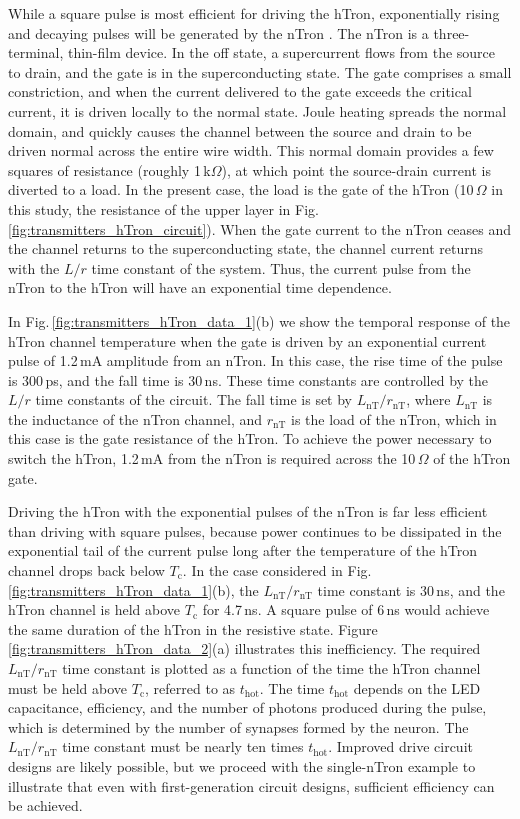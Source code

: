 \documentclass[aip,amsmath,amssymb,reprint,nofootinbib]{revtex4-1}
\begin{document}
While a square pulse is most efficient for driving the hTron, exponentially rising and decaying pulses will be generated by the nTron \cite{mcbe2014}. The nTron is a three-terminal, thin-film device. In the off state, a supercurrent flows from the source to drain, and the gate is in the superconducting state. The gate comprises a small constriction, and when the current delivered to the gate exceeds the critical current, it is driven locally to the normal state. Joule heating spreads the normal domain, and quickly causes the channel between the source and drain to be driven normal across the entire wire width. This normal domain provides a few squares of resistance (roughly 1\,k$\Omega$), at which point the source-drain current is diverted to a load. In the present case, the load is the gate of the hTron (10\,$\Omega$ in this study, the resistance of the upper layer in Fig.\,\ref{fig:transmitters_hTron_circuit}). When the gate current to the nTron ceases and the channel returns to the superconducting state, the channel current returns with the $L/r$ time constant of the system. Thus, the current pulse from the nTron to the hTron will have an exponential time dependence. 

In Fig.\,\ref{fig:transmitters_hTron_data_1}(b) we show the temporal response of the hTron channel temperature when the gate is driven by an exponential current pulse of 1.2\,mA amplitude from an nTron. In this case, the rise time of the pulse is 300\,ps, and the fall time is 30\,ns. These time constants are controlled by the $L/r$ time constants of the circuit. The fall time is set by $L_{\mathrm{nT}}/r_{\mathrm{nT}}$, where $L_{\mathrm{nT}}$ is the inductance of the nTron channel, and $r_{\mathrm{nT}}$ is the load of the nTron, which in this case is the gate resistance of the hTron. To achieve the power necessary to switch the hTron, 1.2\,mA from the nTron is required across the 10\,$\Omega$ of the hTron gate.

Driving the hTron with the exponential pulses of the nTron is far less efficient than driving with square pulses, because power continues to be dissipated in the exponential tail of the current pulse long after the temperature of the hTron channel drops back below $T_{\mathrm{c}}$. In the case considered in Fig.\,\ref{fig:transmitters_hTron_data_1}(b), the $L_{\mathrm{nT}}/r_{\mathrm{nT}}$ time constant is 30\,ns, and the hTron channel is held above $T_{\mathrm{c}}$ for 4.7\,ns. A square pulse of 6\,ns would achieve the same duration of the hTron in the resistive state. Figure \ref{fig:transmitters_hTron_data_2}(a) illustrates this inefficiency. The required $L_{\mathrm{nT}}/r_{\mathrm{nT}}$ time constant is plotted as a function of the time the hTron channel must be held above $T_{\mathrm{c}}$, referred to as $t_{\mathrm{hot}}$. The time $t_{\mathrm{hot}}$ depends on the LED capacitance, efficiency, and the number of photons produced during the pulse, which is determined by the number of synapses formed by the neuron. The $L_{\mathrm{nT}}/r_{\mathrm{nT}}$ time constant must be nearly ten times $t_{\mathrm{hot}}$. Improved drive circuit designs are likely possible, but we proceed with the single-nTron example to illustrate that even with first-generation circuit designs, sufficient efficiency can be achieved. 
\end{document}

